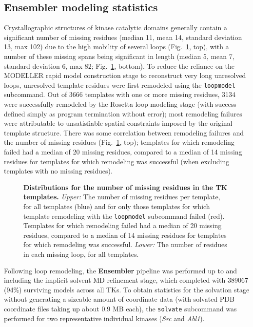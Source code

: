 \documentclass[10pt,letterpaper]{article}
\begin{document}
\subsection*{Ensembler modeling statistics}

Crystallographic structures of kinase catalytic domains generally contain a significant number of missing residues (median 11, mean 14, standard deviation 13, max 102) due to the high mobility of several loops (Fig.~\ref{figure:loopmodel-nmissing-residues}, top), with a number of these missing spans being significant in length (median 5, mean 7, standard deviation 6, max 82; Fig.~\ref{figure:loopmodel-nmissing-residues}, bottom).
To reduce the reliance on the MODELLER rapid model construction stage to reconstruct very long unresolved loops, unresolved template residues were first remodeled using the {\tt loopmodel} subcommand.
Out of \num{3666} templates with one or more missing residues, \num{3134} were successfully remodeled by the Rosetta loop modeling stage (with success defined simply as program termination without error); most remodeling failures were attributable to unsatisfiable spatial constraints imposed by the original template structure.
There was some correlation between remodeling failures and the number of missing residues (Fig.~\ref{figure:loopmodel-nmissing-residues}, top); templates for which remodeling failed had a median of 20 missing residues, compared to a median of 14 missing residues for templates for which remodeling was successful (when excluding templates with no missing residues).

\begin{figure}[h]
    \caption{{\bf Distributions for the number of missing residues in the TK templates.}
    \emph{Upper:} The number of missing residues per template, for all templates (blue) and for only those templates for which template remodeling with the {\tt loopmodel} subcommand failed (red).
    Templates for which remodeling failed had a median of 20 missing residues, compared to a median of 14 missing residues for templates for which remodeling was successful.
    \emph{Lower:} The number of residues in each missing loop, for all templates.    
}
    \label{figure:loopmodel-nmissing-residues}
\end{figure}

Following loop remodeling, the {\bf Ensembler} pipeline was performed up to and including the implicit solvent MD refinement stage, which completed with \num{389067} (94\%) surviving models across all TKs.
To obtain statistics for the solvation stage without generating a sizeable amount of coordinate data (with solvated PDB coordinate files taking up about 0.9 MB each), the {\tt solvate} subcommand was performed for two representative individual kinases (\emph{Src} and \emph{Abl1}).
\end{document}
